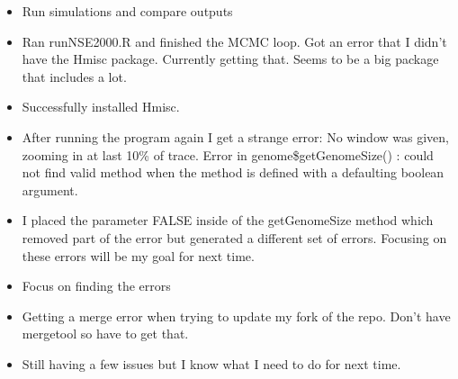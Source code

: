 \documentclass[letterpaper,index=totoc,hyperref,openany]{labbook} %
\begin{document}

\begin{itemize}
	\item Run simulations and compare outputs
\end{itemize}

\begin{itemize}
	\item Ran runNSE2000.R and finished the MCMC loop. Got an error that I didn't have the Hmisc package. Currently getting that. Seems to be a big package that includes a lot.
	\item Successfully installed Hmisc.
	\item After running the program again I get a strange error: No window was given, zooming in at last 10\% of trace. Error in genome\$getGenomeSize() : could not find valid method when the method is defined with a defaulting boolean argument.
	\item I placed the parameter FALSE inside of the getGenomeSize method which removed part of the error but generated a different set of errors. Focusing on these errors will be my goal for next time.
\end{itemize}


\begin{itemize}
	\item Focus on finding the errors
\end{itemize}

\begin{itemize}
	\item Getting a merge error when trying to update my fork of the repo. Don't have mergetool so have to get that.
	\item Still having a few issues but I know what I need to do for next time. 
\end{itemize}



\printbibliography
\end{document}
